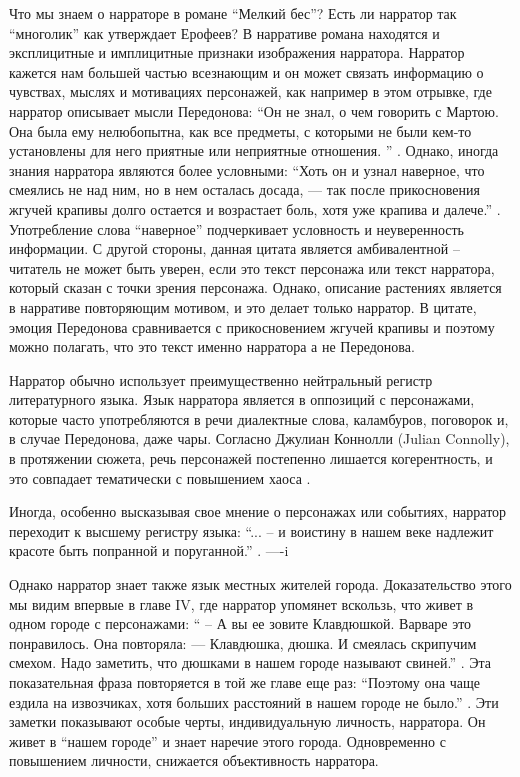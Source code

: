 \documentclass[12pt,a4paper]{article}
\begin{document}
Что мы знаем о нарраторе в романе \enquote{Мелкий бес}?
Есть ли нарратор так \enquote{многолик} как утверждает Ерофеев? В нарративе романа находятся и эксплицитные и имплицитные признаки изображения нарратора. Нарратор кажется нам большей частью всезнающим и он может связать информацию о чувствах, мыслях и мотивациях персонажей, как например в этом отрывке, где нарратор описывает мысли Передонова:  \enquote{Он не знал, о чем говорить с Мартою. Она была ему нелюбопытна,
как все предметы, с которыми не были кем-то установлены для него
приятные или неприятные отношения.
} \parencite[18]{sologub2004}. Однако, иногда знания нарратора являются более условными: \enquote{Хоть он и узнал наверное, что смеялись не над ним, но в нем осталась досада, — так после прикосновения жгучей крапивы долго остается и  возрастает боль, хотя уже крапива и далече.} \parencite[19]{sologub2004}. Употребление слова \enquote{наверное} подчеркивает условность и неуверенность информации. С другой стороны, данная цитата является амбивалентной – читатель не может быть уверен, если это текст персонажа или текст нарратора, который сказан с точки зрения персонажа. Однако, описание растениях является в нарративе повторяющим мотивом, и это делает только нарратор. В цитате, эмоция Передонова сравнивается с прикосновением жгучей крапивы и поэтому можно полагать, что это текст именно нарратора а не Передонова.

Нарратор обычно использует преимущественно нейтральный регистр литературного языка. Язык нарратора является в оппозиций с персонажами, которые часто употребляются в речи диалектные слова, каламбуров, поговорок и, в случае Передонова, даже чары. Согласно Джулиан Коннолли (Julian Connolly), в протяжении сюжета, речь персонажей постепенно лишается когерентность, и это совпадает тематически с повышением хаоса \parencite[358--359]{connolly1981}.

Иногда, особенно высказывая свое мнение о персонажах или событиях, нарратор переходит к высшему регистру языка: \enquote{... – и воистину в нашем веке надлежит красоте быть попранной и поруганной.} \parencite[51]{sologub2004}.
----i

Однако нарратор знает также язык местных жителей города. Доказательство этого мы видим впервые в главе IV, где нарратор упомянет вскользь, что живет в одном городе с персонажами: \enquote{ – А вы ее зовите Клавдюшкой.
Варваре это понравилось. Она повторяла:
— Клавдюшка, дюшка.
И смеялась скрипучим смехом. Надо заметить, что дюшками в 
нашем городе называют свиней.} \parencite[33]{sologub2004}. Эта показательная фраза повторяется в той же главе еще раз: \enquote{Поэтому она чаще ездила на извозчиках,
хотя больших расстояний в нашем городе не было.} \parencite[34]{sologub2004}. Эти заметки показывают особые черты, индивидуальную личность,  нарратора. Он живет в \enquote{нашем городе} и знает наречие этого города. Одновременно с повышением личности, снижается объективность нарратора.
\end{document}
